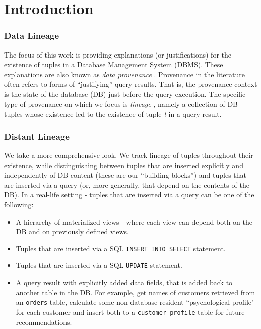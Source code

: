 \chapter{Introduction}
\label{chap:intro}


\subsection*{Data Lineage}
The focus of this work is providing explanations (or justifications) for the existence of tuples in a Database Management System (DBMS). These explanations are also known as \textit{data provenance} \cite{cheney2009provenance}.
Provenance in the literature \cite{Ives2008, Deutch2015} often refers to forms of ``justifying'' query results. That is, the provenance context is the state of the database (DB) just before the query execution. The specific type of provenance on which we focus is \textit{lineage} \cite{Cui:2000:TLV:357775.357777}, namely a collection of DB tuples whose existence led to the existence of tuple \textit{t} in a query result. 


\subsection*{Distant Lineage}
We take a more comprehensive look. We track lineage of tuples throughout their existence, while distinguishing between tuples that are inserted explicitly and independently of DB content (these are our ``building blocks'') and tuples that are inserted via a query (or, more generally, that depend on the contents of the DB).
In a real-life setting - tuples that are inserted via a query can be one of the following:
\begin{itemize}
    \item A hierarchy of materialized views - where each view can depend both on the DB and on previously defined views.
    \item Tuples that are inserted via a SQL \texttt{INSERT INTO SELECT} statement.
    \item Tuples that are inserted via a SQL \texttt{UPDATE} statement.
    \item A query result with explicitly added data fields, that is added back to another table in the DB. For example, get names of customers retrieved from an \texttt{orders} table, calculate some non-database-resident ``psychological profile" for each customer and insert both to a \texttt{customer\_profile} table for future recommendations.
\end{itemize}


